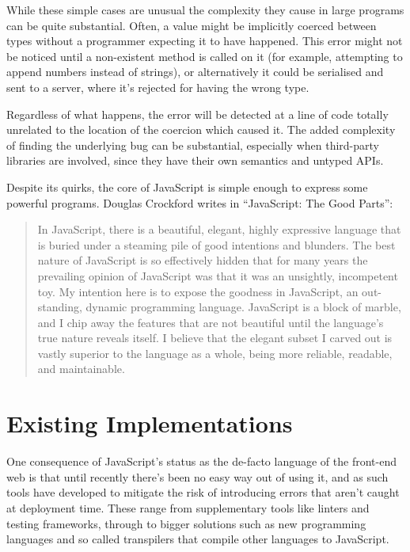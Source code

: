 \documentclass[british, twoside]{bhamthesis}
\theoremstyle{definition}
\begin{document}
    While these simple cases are unusual the complexity they cause in large programs can be quite substantial. Often, a value might be implicitly coerced between types without a programmer expecting it to have happened. This error might not be noticed until a non-existent method is called on it (for example, attempting to append numbers instead of strings), or alternatively it could be serialised and sent to a server, where it's rejected for having the wrong type.

    Regardless of what happens, the error will be detected at a line of code totally unrelated to the location of the coercion which caused it. The added complexity of finding the underlying bug can be substantial, especially when third-party libraries are involved, since they have their own semantics and untyped APIs.

    Despite its quirks, the core of JavaScript is simple enough to express some powerful programs. Douglas Crockford writes in “JavaScript: The Good Parts”:

    \begin{quote}
      In JavaScript, there is a beautiful, elegant, highly expressive language that is buried under a steaming pile of good intentions and blunders. The best nature of JavaScript is so effectively hidden that for many years the prevailing opinion of JavaScript was that it was an unsightly, incompetent toy. My intention here is to expose the goodness in JavaScript, an out- standing, dynamic programming language. JavaScript is a block of marble, and I chip away the features that are not beautiful until the language’s true nature reveals itself. I believe that the elegant subset I carved out is vastly superior to the language as a whole, being more reliable, readable, and maintainable.
    \end{quote}
    \autocite{Crockford2008}

  \section{Existing Implementations}
    One consequence of JavaScript's status as the de-facto language of the front-end web is that until recently there's been no easy way out of using it, and as such tools have developed to mitigate the risk of introducing errors that aren't caught at deployment time. These range from supplementary tools like linters and testing frameworks, through to bigger solutions such as new programming languages and so called transpilers that compile other languages to JavaScript.
\end{document}
